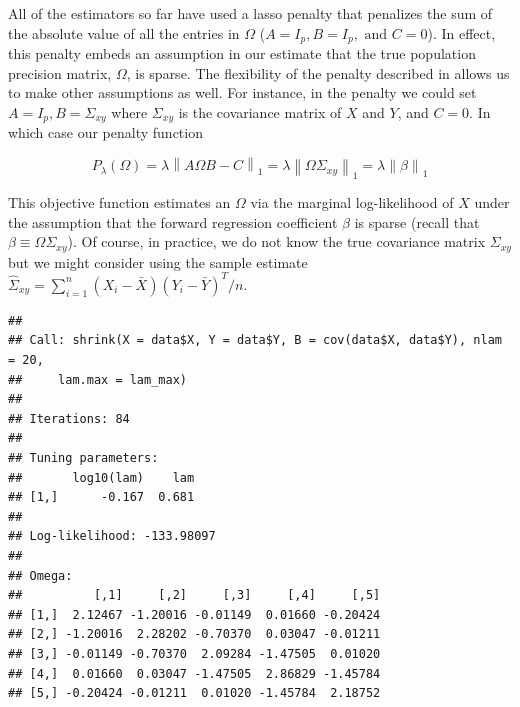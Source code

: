 \documentclass[11pt,]{report}
\newenvironment{Shaded}{\begin{snugshade}}{\end{snugshade}}
\newcommand{\CommentTok}[1]{\textcolor[rgb]{0.56,0.35,0.01}{\textit{#1}}}
\newcommand{\DataTypeTok}[1]{\textcolor[rgb]{0.13,0.29,0.53}{#1}}
\newcommand{\DecValTok}[1]{\textcolor[rgb]{0.00,0.00,0.81}{#1}}
\newcommand{\KeywordTok}[1]{\textcolor[rgb]{0.13,0.29,0.53}{\textbf{#1}}}
\newcommand{\NormalTok}[1]{#1}
\newcommand{\OperatorTok}[1]{\textcolor[rgb]{0.81,0.36,0.00}{\textbf{#1}}}
\newcommand{\StringTok}[1]{\textcolor[rgb]{0.31,0.60,0.02}{#1}}
\begin{document}
\vspace{0.5cm}

All of the estimators so far have used a lasso penalty that penalizes the sum of the absolute value of all the entries in \(\Omega\) (\(A = I_{p}, B = I_{p}, \mbox{ and } C = 0\)). In effect, this penalty embeds an assumption in our estimate that the true population precision matrix, \(\Omega\), is sparse. The flexibility of the penalty described in \citet{molstad2017shrinking} allows us to make other assumptions as well. For instance, in the penalty we could set \(A = I_{p}, B = \Sigma_{xy}\) where \(\Sigma_{xy}\) is the covariance matrix of \(X\) and \(Y\), and \(C = 0\). In which case our penalty function

\[P_{\lambda}\left(\Omega \right) = \lambda\left\| A\Omega B - C \right\|_{1} = \lambda\left\| \Omega\Sigma_{xy} \right\|_{1} = \lambda\left\| \beta \right\|_{1} \]

This objective function estimates an \(\Omega\) via the marginal log-likelihood of \(X\) under the assumption that the forward regression coefficient \(\beta\) is sparse (recall that \(\beta \equiv \Omega\Sigma_{xy}\)). Of course, in practice, we do not know the true covariance matrix \(\Sigma_{xy}\) but we might consider using the sample estimate \(\hat{\Sigma}_{xy} = \sum_{i = 1}^{n}\left(X_{i} - \bar{X}\right)\left(Y_{i} - \bar{Y}\right)^{T}/n\).

\vspace{0.5cm}

\begin{Shaded}
\end{Shaded}

\begin{verbatim}
## 
## Call: shrink(X = data$X, Y = data$Y, B = cov(data$X, data$Y), nlam = 20, 
##     lam.max = lam_max)
## 
## Iterations: 84
## 
## Tuning parameters:
##       log10(lam)    lam
## [1,]      -0.167  0.681
## 
## Log-likelihood: -133.98097
## 
## Omega:
##          [,1]     [,2]     [,3]     [,4]     [,5]
## [1,]  2.12467 -1.20016 -0.01149  0.01660 -0.20424
## [2,] -1.20016  2.28202 -0.70370  0.03047 -0.01211
## [3,] -0.01149 -0.70370  2.09284 -1.47505  0.01020
## [4,]  0.01660  0.03047 -1.47505  2.86829 -1.45784
## [5,] -0.20424 -0.01211  0.01020 -1.45784  2.18752
\end{verbatim}
\end{document}
